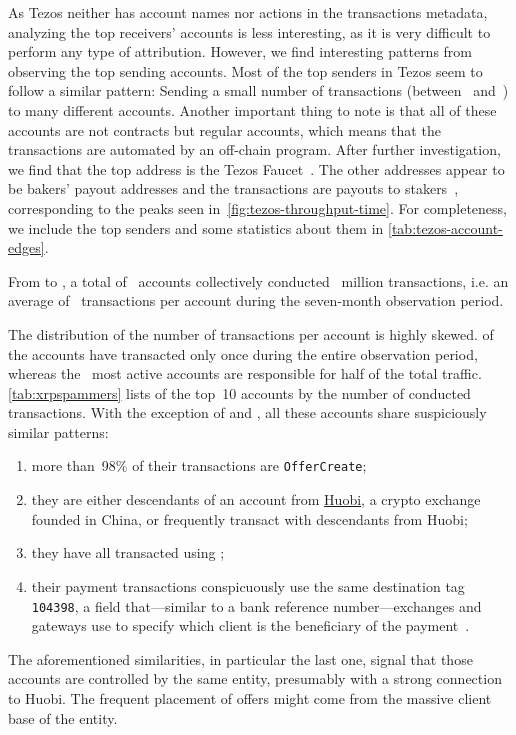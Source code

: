 

As Tezos neither has account names nor actions in the transactions metadata, analyzing the top receivers' accounts is less interesting, as it is very difficult to perform any type of attribution. However, we find interesting patterns from observing the top sending accounts.
Most of the top senders in Tezos seem to follow a similar pattern: Sending a small number of transactions (between~ and~) to many different accounts. 
Another important thing to note is that all of these accounts are not contracts but regular accounts, which means that the transactions are automated by an off-chain program.
After further investigation, we find that the top address is the Tezos Faucet~\cite{tezos-faucet}. The other addresses appear to be bakers' payout addresses and the transactions are payouts to stakers~\cite{backerei}, corresponding to the peaks seen in~\autoref{fig:tezos-throughput-time}. For completeness, we include the top senders and some statistics about them in \autoref{tab:tezos-account-edges}.

From \startdate to \finishdate, a total of~ accounts collectively conducted~ million transactions, i.e. an average of~ transactions per account during the seven-month observation period.

The distribution of the number of transactions per account is highly skewed. 
 of the accounts have transacted only once during the entire observation period, whereas the~ most active accounts are responsible for half of the total traffic. 
\autoref{tab:xrpspammers} lists of the top~10 accounts by the number of conducted transactions. 
With the exception of  and , all these accounts share suspiciously similar patterns:
\begin{enumerate}
    \item more than~98\% of their transactions are \texttt{OfferCreate};
    \item they are either descendants of an account from \href{https://www.huobi.com/}{Huobi}, a crypto exchange founded in China, or frequently transact with descendants from Huobi;
    \item they have all transacted using ;
    \item their payment transactions conspicuously use the same destination tag \texttt{104398}, a field that---similar to a bank reference number---exchanges and gateways use to specify which client is the beneficiary of the payment~\cite{XRPLedger2020b}.
\end{enumerate}
%
The aforementioned similarities, in particular the last one, signal that those accounts are controlled by the same entity, presumably with a strong connection to Huobi. 
The frequent placement of offers might come from the massive client base of the entity.

